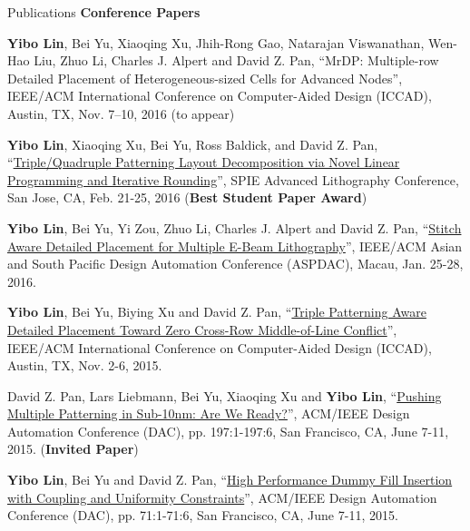 \begin{rSection}{Publications}
\textbf{Conference Papers}
\begin{description}[font=\normalfont]
\item[{[C6]}]{
    \textbf{Yibo Lin}, Bei Yu, Xiaoqing Xu, Jhih-Rong Gao, Natarajan Viswanathan, Wen-Hao Liu, Zhuo Li, Charles J. Alpert and David Z. Pan, 
    ``MrDP: Multiple-row Detailed Placement of Heterogeneous-sized Cells for Advanced Nodes'', 
    IEEE/ACM International Conference on Computer-Aided Design (ICCAD), Austin, TX, Nov. 7–10, 2016
    (to appear)
}
\item[{[C5]}]{
    \textbf{Yibo Lin}, Xiaoqing Xu, Bei Yu, Ross Baldick, and David Z. Pan, 
 ``\href{proceedings.spiedigitallibrary.org/proceeding.aspx?articleid=2505329}{Triple/Quadruple Patterning Layout Decomposition via Novel Linear Programming and Iterative Rounding}'', 
    SPIE Advanced Lithography Conference, San Jose, CA, Feb. 21-25, 2016
    (\textbf{Best Student Paper Award})
}
\item[{[C4]}]{
 \textbf{Yibo Lin}, Bei Yu, Yi Zou, Zhuo Li, Charles J. Alpert and David Z. Pan, 
 ``\href{http://ieeexplore.ieee.org/xpl/articleDetails.jsp?arnumber=7428009}{Stitch Aware Detailed Placement for Multiple E-Beam Lithography}'', 
    IEEE/ACM Asian and South Pacific Design Automation Conference (ASPDAC), Macau, Jan. 25-28, 2016.
}
\item[{[C3]}]{
 \textbf{Yibo Lin}, Bei Yu, Biying Xu and David Z. Pan, 
 ``\href{http://dl.acm.org/citation.cfm?id=2840875}{Triple Patterning Aware Detailed Placement Toward Zero Cross-Row Middle-of-Line Conflict}'', 
    IEEE/ACM International Conference on Computer-Aided Design (ICCAD), Austin, TX, Nov. 2-6, 2015.
}
\item[{[C2]}]{
 David Z. Pan, Lars Liebmann, Bei Yu, Xiaoqing Xu and \textbf{Yibo Lin}, 
 ``\href{http://dl.acm.org/citation.cfm?id=2744769.2747940}{Pushing Multiple Patterning in Sub-10nm: Are We Ready?}'', 
    ACM/IEEE Design Automation Conference (DAC), pp. 197:1-197:6, San Francisco, CA, June 7-11, 2015. 
    (\textbf{Invited Paper})
}
\item[{[C1]}]{
 \textbf{Yibo Lin}, Bei Yu and David Z. Pan, 
 ``\href{http://dl.acm.org/citation.cfm?id=2744769.2744850}{High Performance Dummy Fill Insertion with Coupling and Uniformity Constraints}'',
    ACM/IEEE Design Automation Conference (DAC), pp. 71:1-71:6, San Francisco, CA, June 7-11, 2015. 
}
\end{description}


\end{rSection}

